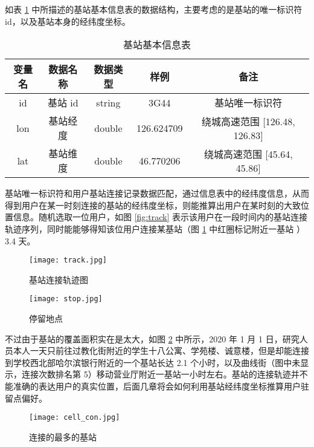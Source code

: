 如表 \ref{tab:cell_info} 中所描述的基站基本信息表的数据结构，主要考虑的是基站的唯一标识符 id，以及基站本身的经纬度坐标。

\begin{table}[htbp]
    \caption{基站基本信息表}
    \vspace{0.5em}\centering\wuhao
    \begin{tabular}{ccccc}
        \toprule[1.5pt]
        变量名 & 数据名称 & 数据类型 & 样例 & 备注 \\
        \midrule[1pt]
        id & 基站 id & string & 3G44 & 基站唯一标识符 \\
        lon & 基站经度 & double & 126.624709 & 绕城高速范围 [126.48, 126.83] \\
        lat & 基站维度 & double & 46.770206 & 绕城高速范围 [45.64, 45.86] \\
        \bottomrule[1.5pt]
    \end{tabular}
    \label{tab:cell_info}
\end{table}

基站唯一标识符和用户基站连接记录数据匹配，通过信息表中的经纬度信息，从而得到用户在某一时刻连接的基站的经纬度坐标，则能推算出用户在某时刻的大致位置信息。随机选取一位用户，如图 \ref{fig:track} 表示该用户在一段时间内的基站连接轨迹序列，同时能能够得知该位用户连接某基站（图 \ref{fig:stop} 中红圈标记附近一基站 ）3.4 天。

\begin{figure}[ht]
    \centering
    \begin{minipage}[t]{0.49\textwidth}
        \centering
        \texttt{[image: track.jpg]}
        \caption{基站连接轨迹图}
        \label{fig:track}
    \end{minipage}
    \begin{minipage}[t]{0.49\textwidth}
        \centering
        \texttt{[image: stop.jpg]}
        \caption{停留地点}
        \label{fig:stop}
    \end{minipage}
\end{figure}

不过由于基站的覆盖面积实在是太大，如图 \ref{fig:cell_con} 中所示，2020 年 1 月 1 日，研究人员本人一天只前往过教化街附近的学生十八公寓、学苑楼、诚意楼，但是却能连接到学校西北部哈尔滨银行附近的一个基站长达 2.1 个小时，以及曲线街（图中未显示，连接次数排名第 5）移动营业厅附近一基站一小时左右。基站的连接轨迹并不能准确的表达用户的真实位置，后面几章将会如何利用基站经纬度坐标推算用户驻留点偏好。

\begin{figure}[ht]
    \centering
    \texttt{[image: cell\_con.jpg]}
    \caption{连接的最多的基站}
    \label{fig:cell_con}
\end{figure}

